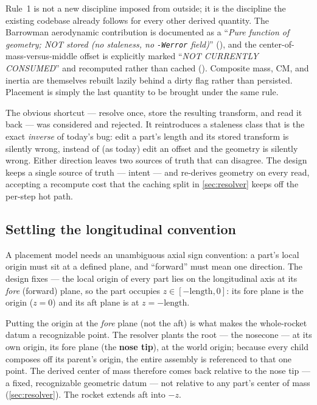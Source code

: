 Rule~1 is not a new discipline imposed from outside; it is the discipline the existing
codebase already follows for every other derived quantity. The Barrowman aerodynamic
contribution is documented as a ``\emph{Pure function of geometry; NOT stored (no staleness,
no \texttt{-Werror} field)}'' (), and the
center-of-mass-versus-middle offset is explicitly marked ``\emph{NOT CURRENTLY CONSUMED}''
and recomputed rather than cached (). Composite mass, CM, and
inertia are themselves rebuilt lazily behind a dirty flag rather than persisted. Placement
is simply the last quantity to be brought under the same rule.

\begin{rejected}
The obvious shortcut --- resolve once, store the resulting transform, and read it back ---
was considered and rejected. It reintroduces a staleness class that is the exact
\emph{inverse} of today's bug: edit a part's length and its stored transform is silently
wrong, instead of (as today) edit an offset and the geometry is silently wrong. Either
direction leaves two sources of truth that can disagree. The design keeps a single source
of truth --- intent --- and re-derives geometry on every read, accepting a recompute cost
that the caching split in \cref{sec:resolver} keeps off the per-step hot path.
\end{rejected}

\subsection{Settling the longitudinal convention}

A placement model needs an unambiguous axial sign convention: a part's local origin must
sit at a defined plane, and ``forward'' must mean one direction. The design fixes
\textbf{\zfwd} --- the local origin of every part lies on the longitudinal axis at its
\emph{fore} (forward) plane, so the part occupies $z \in [-\text{length}, 0]$: its fore plane
is the origin ($z = 0$) and its aft plane is at $z = -\text{length}$.

Putting the origin at the \emph{fore} plane (not the aft) is what makes the whole-rocket datum a
recognizable point. The resolver plants the root --- the nosecone --- at its own origin, its
fore plane (the \textbf{nose tip}), at the world origin; because every child composes off its
parent's origin, the entire assembly is referenced to that one point. The derived center of mass
therefore comes back relative to the nose tip --- a fixed, recognizable geometric datum --- not
relative to any part's center of mass (\cref{sec:resolver}). The rocket extends aft into $-z$.

